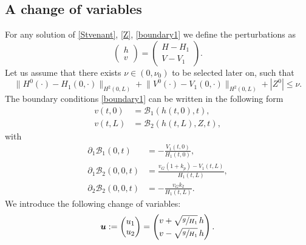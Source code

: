 \documentclass[JEP,XML,SOM,Unicode]{cedram}
\let\mathcal\mathscr
\theoremstyle{definition}
\begin{document}
\subsection{A change of variables}
For any solution of \eqref{Stvenant}, \eqref{Z}, \eqref{boundary1}
we define the perturbations as
\begin{equation}
\begin{pmatrix}
h\\v
\end{pmatrix}=
\begin{pmatrix}
H-H_{1}\\
V-V_{1}
\end{pmatrix}.
\label{change1}
\end{equation}
Let us assume that there exists $\nu\in(0,\nu_{0})$ to be selected later on, such that
\begin{equation*}
\lVert H^{0}(\cdot)-H_{1}(0,\cdot)\rVert_{H^{2}(0,L)}+\lVert V^{0}(\cdot)-V_{1}(0,\cdot)\rVert_{H^{2}(0,L)}+|Z^{0}|\leq \nu.
\end{equation*}
The boundary conditions \eqref{boundary1} can be written in the following form
\begin{equation}
\begin{split}
v(t,0)&=\mathcal{B}_{1}(h(t,0),t),\\
v(t,L)&=\mathcal{B}_{2}(h(t,L),Z,t),
\end{split}
\label{bound1}
\end{equation}
with
\begin{equation}
\begin{split}
\partial_{1}\mathcal{B}_{1}(0,t)&=-\frac{V_{1}(t,0)}{H_{1}(t,0)},\\
\partial_{1}\mathcal{B}_{2}(0,0,t)&=\frac{v_{G}(1+k_{p})-V_{1}(t,L)}{H_{1}(t,L)},\\
\partial_{2}\mathcal{B}_{2}(0,0,t)&=-\frac{v_{G}k_{I}}{H_{1}(t,L)}.
\end{split}
\label{k1k30}
\end{equation}
We introduce the following change of variables:
\begin{equation}
\boldsymbol{u}: =\begin{pmatrix}
u_{1}\\u_{2}
\end{pmatrix}=
\begin{pmatrix}
v+\sqrt{\sfrac{g}{H_{1}}}\,h\\[2pt]
v-\sqrt{\sfrac{g}{H_{1}}}\,h
\end{pmatrix}.
\label{change2}
\end{equation}
\end{document}
